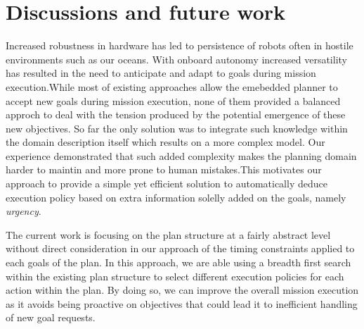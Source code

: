 \section{Discussions and future work}
\label{sec:conclude}

Increased robustness in hardware has led to persistence of robots
often in hostile environments such as our oceans. With onboard
autonomy increased versatility has resulted in the need to anticipate
and adapt to goals during mission execution.While most of existing
approaches allow the emebedded planner to accept new goals during
mission execution, none of them provided a balanced approch to deal
with the tension produced by the potential emergence of these new
objectives. So far the only solution was to integrate such knowledge
within the domain description itself which results on a more complex
model. Our experience demonstrated that such added complexity 
makes the planning domain harder to maintin and more prone to human
mistakes.This motivates our approach to provide a simple yet efficient 
solution to automatically deduce execution policy based on
extra information solelly added on the goals, namely {\em urgency}.


The current work is focusing on the plan structure at a fairly
abstract level without direct consideration in our approach of the
timing constraints applied to each goals of the plan. In this approach,
we are able using a breadth first search within the existing plan
structure to select different execution policies for each action
within the plan. By doing so, we can improve the overall mission 
execution as it avoids being proactive on objectives that could lead it
to inefficient handling of new goal requests.

